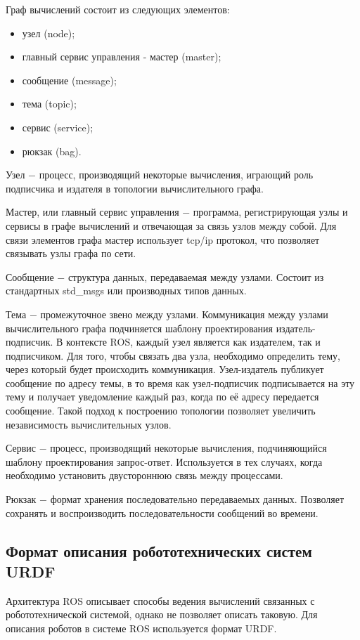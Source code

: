 \documentclass[oneside,final,14pt]{extreport}
\begin{document}
Граф вычислений состоит из следующих элементов:

\begin{itemize}
\item узел (node);
\item главный сервис управления - мастер (master);
\item сообщение (message);
\item тема (topic);
\item сервис (service);
\item рюкзак (bag).
\end{itemize}

Узел $-$  процесс, производящий некоторые вычисления, играющий роль подписчика и издателя в топологии вычислительного графа. 

Мастер, или главный сервис управления $-$ программа, регистрирующая узлы и сервисы в графе вычислений и отвечающая за связь узлов между собой. Для связи элементов графа мастер использует tcp/ip протокол, что позволяет связывать узлы графа по сети.   

Сообщение $-$ структура данных, передаваемая между узлами. Состоит из стандартных std_msgs или производных типов данных.

Тема $-$  промежуточное звено между узлами. Коммуникация между узлами вычислительного графа подчиняется шаблону проектирования издатель-подписчик. В контексте ROS, каждый узел является как издателем, так и подписчиком. Для того, чтобы связать два узла, необходимо определить тему, через который будет происходить коммуникация. Узел-издатель публикует сообщение по адресу темы, в то время как узел-подписчик подписывается на эту тему и получает уведомление каждый раз, когда по её адресу передается сообщение. Такой подход к построению топологии позволяет увеличить независимость вычислительных узлов.

Сервис $-$ процесс, производящий некоторые вычисления, подчиняющийся шаблону проектирования запрос-ответ. Используется в тех случаях, когда необходимо установить двустороннюю связь между процессами. 

Рюкзак $-$ формат хранения последовательно передаваемых данных. Позволяет сохранять и воспроизводить последовательности сообщений во времени.

\subsection{Формат описания робототехнических систем  URDF}
\label{chapt:URDF}
Архитектура ROS описывает способы ведения вычислений связанных с робототехнической системой, однако не позволяет описать таковую. Для описания роботов в системе ROS используется формат URDF.
\end{document}

